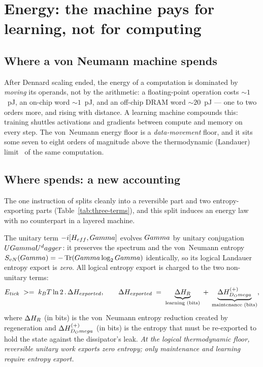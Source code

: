 \section{Energy: the machine pays for learning, not for computing}
\label{sec:energy}

\subsection{Where a von Neumann machine spends}

After Dennard scaling ended, the energy of a computation is dominated by
\emph{moving} its operands, not by the arithmetic: a floating-point operation
costs $\sim\!1$~pJ, an on-chip word $\sim\!1$~pJ, and an off-chip DRAM word
$\sim\!20$~pJ --- one to two orders more, and rising with distance. A
learning machine compounds this: training shuttles activations and gradients
between compute and memory on every step. The von~Neumann energy floor is a
\emph{data-movement} floor, and it sits some seven to eight orders of
magnitude above the thermodynamic (Landauer) limit~\cite{landauer1961,bennett1973} of the same computation.

\subsection{Where \TALOS{} spends: a new accounting}

The one instruction of \TALOS{} splits cleanly into a reversible part and two
entropy-exporting parts (Table~\ref{tab:three-terms}), and this split induces
an energy law with no counterpart in a layered machine.

\begin{claimbox}
The unitary term $-i[H_{eff},Gamma]$ evolves $Gamma$ by unitary
conjugation $UGamma U^dagger$: it preserves the spectrum and the von~Neumann
entropy $S_{vN}(Gamma)=-\Tr(Gamma\log_2Gamma)$ identically, so its
logical Landauer entropy export is \emph{zero}. All logical entropy export is
charged to the two non-unitary terms:
\begin{equation}
\label{eq:energy-law}
E_{tick} \;>=\; k_B T\ln 2 \,.\, \Delta H_{exported},
\qquad
\Delta H_{exported} \;=\; \underbrace{\Delta H_{R}}_{\text{learning (bits)}}
\;+\; \underbrace{\Delta H_{D_Omega}^{(+)}}_{\text{maintenance (bits)}},
\end{equation}
where $\Delta H_{R}$ (in bits) is the von~Neumann entropy reduction
created by regeneration and $\Delta H_{D_Omega}^{(+)}$ (in bits) is the entropy
that must be re-exported to hold the state against the dissipator's leak.
\emph{At the logical thermodynamic floor, reversible unitary work exports zero
entropy; only maintenance and learning require entropy export.}
\end{claimbox}

